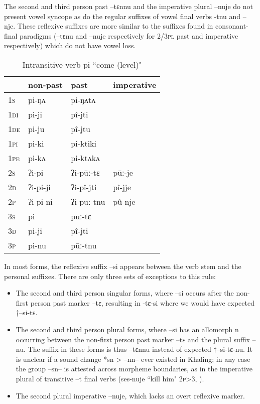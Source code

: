 \documentclass[twoside,a4paper,11pt]{article}
\newcommand{\ipa}[1]{{\phon#1}}
\begin{document}
 The second and third person past \ipa{--tɛnnu} and  the imperative plural \ipa{--nuje} do not present vowel syncope as do the regular  suffixes of vowel final verbs \ipa{-tnu} and \ipa{--nje}. These reflexive suffixes are more similar to the suffixes found in   consonant-final paradigms (\ipa{--tɛnu} and \ipa{--nuje} respectively for \textsc{2/3pl} past and imperative respectively) which do not have vowel loss.
 


\begin{table}[h] 
\caption{Intransitive verb \ipa{pi} ``come (level)" } \centering \label{tab:pi}
\begin{tabular}{l|l|l|l}  
 \toprule
& non-past & past & imperative\\
\midrule
\textsc{1s}  &  \ipa{pi-ŋʌ}  &  \ipa{pi-ŋʌtʌ}   \\
\textsc{1di}  &  \ipa{pi-ji}  &  \ipa{pî-jti}   \\
\textsc{1de}  &  \ipa{pi-ju}  &  \ipa{pî-jtu}   \\
\textsc{1pi}  &  \ipa{pi-ki}  &  \ipa{pi-ktiki}   \\
\textsc{1pe}  &  \ipa{pi-kʌ}  &  \ipa{pi-ktʌkʌ}   \\
\midrule
\textsc{2s}  &  \ipa{ʔi-pi}  &  \ipa{ʔi-pūː-tɛ}  &  \ipa{pūː-je}   \\
\textsc{2d}  &  \ipa{ʔi-pi-ji}  &  \ipa{ʔi-pî-jti}  &  \ipa{pî-jje}   \\
\textsc{2p}  &  \ipa{ʔi-pi-ni}  &  \ipa{ʔi-pūː-tnu}  &  \ipa{pû-nje}   \\
\midrule
\textsc{3s}  &  \ipa{pi}  &  \ipa{puː-tɛ}   \\
\textsc{3d}  &  \ipa{pi-ji}  &  \ipa{pî-jti}   \\
\textsc{3p}  &  \ipa{pi-nu}  &  \ipa{pūː-tnu}   \\
\bottomrule
\end{tabular}
\end{table}


In most forms, the reflexive suffix \ipa{--si} appears between the verb stem and the personal suffixes. There are only three sets of exceptions to this rule:

\begin{itemize}
\item The second and third person singular forms, where \ipa{--si} occurs after the  non-first person past marker \ipa{--tɛ}, resulting in \ipa{-tɛ-si} where we would have expected †\ipa{--si-tɛ}.
\item The   second and third person plural forms, where \ipa{--si} has an allomorph  \ipa{n} occurring between the  non-first person past marker \ipa{--tɛ}  and the plural suffix --\ipa{nu}.  The suffix in these forms is thus \ipa{--tɛnnu} instead of expected †\ipa{--si-tɛ-nu}. It is unclear if a sound change *\ipa{sn} > --\ipa{nn}-- ever existed in Khaling; in any case the group \ipa{--sn--} is attested across morpheme boundaries, as in the imperative plural of transitive \ipa{--t} final verbs (\ipa{ses-nuje} ``kill him" \textsc{2p>3},  \citealt[1118]{jacques12khaling}). 
\item The second plural imperative \ipa{--nuje}, which lacks an  overt reflexive marker.
\end{itemize}
\end{document}
